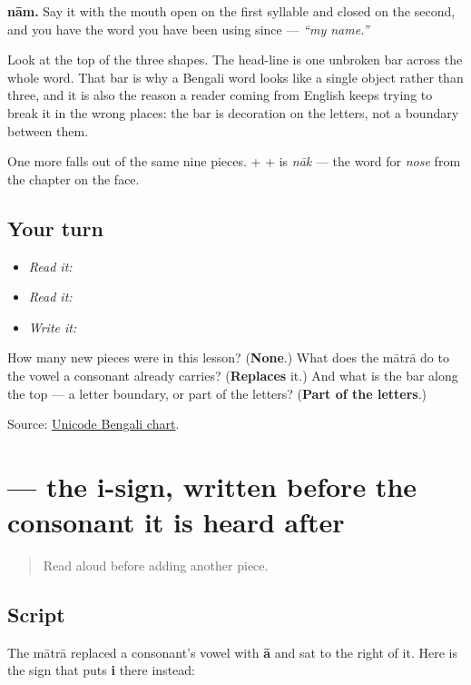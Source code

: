 \textbf{nām.} Say it with the mouth open on the first syllable and closed on the second, and you have the word you have been using since \textbf{ } — \emph{\textquotedblleft{}my name.\textquotedblright{}}

Look at the top of the three shapes. The head-line is one unbroken bar across the whole word. That bar is why a Bengali word looks like a single object rather than three, and it is also the reason a reader coming from English keeps trying to break it in the wrong places: the bar is decoration on the letters, not a boundary between them.

One more falls out of the same nine pieces. \textbf{} + \textbf{} + \textbf{} is \emph{nāk} — the word for \emph{nose} from the chapter on the face.

\subsection*{Your turn}
\begin{itemize}
\raggedright
  \item \emph{Read it:} 
  \item \emph{Read it:} 
  \item \emph{Write it:} 
\end{itemize}

\begin{tcolorbox}[breakable,colback=teal!4,colframe=teal!35!black,title={Before you move on}]
How many new pieces were in this lesson? (\textbf{None}.) What does the mātrā do to the vowel a consonant already carries? (\textbf{Replaces} it.) And what is the bar along the top — a letter boundary, or part of the letters? (\textbf{Part of the letters}.)

Source: \href{https://www.unicode.org/charts/PDF/U0980.pdf}{Unicode Bengali chart}.
\end{tcolorbox}
\section[-i]{ — the i-sign, written before the consonant it is heard after}

\label{lesson:BN-W02-i-matra}



\begin{quote}
Read \textbf{} aloud before adding another piece.
\end{quote}

\subsection*{Script}
The mātrā \textbf{} replaced a consonant's vowel with \textbf{ā} and sat to the right of it. Here is the sign that puts \textbf{i} there instead:

